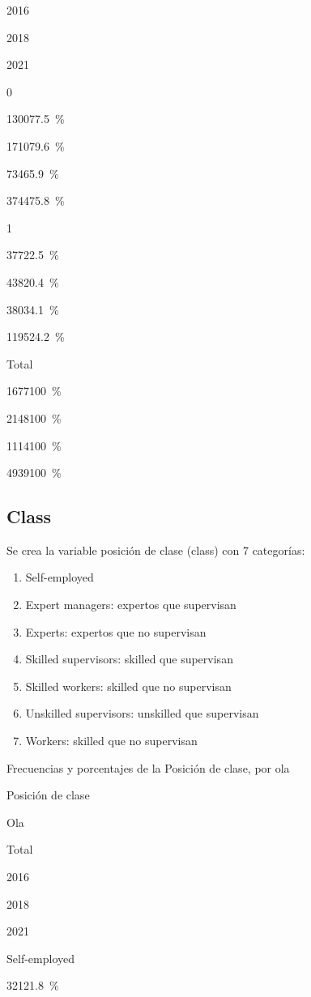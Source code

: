 \documentclass[
  12pt,
]{book}
\providecommand{\tightlist}{%
  \setlength{\itemsep}{0pt}\setlength{\parskip}{0pt}}
\begin{document}
2016

2018

2021

0

{1300}{77.5~\%}

{1710}{79.6~\%}

{734}{65.9~\%}

{3744}{75.8~\%}

1

{377}{22.5~\%}

{438}{20.4~\%}

{380}{34.1~\%}

{1195}{24.2~\%}

Total

{1677}{100~\%}

{2148}{100~\%}

{1114}{100~\%}

{4939}{100~\%}

\hypertarget{class}{%
\subsection{Class}\label{class}}

Se crea la variable posición de clase (class) con 7 categorías:

\begin{enumerate}
\def\labelenumi{\arabic{enumi}.}
\tightlist
\item
  Self-employed
\item
  Expert managers: expertos que supervisan
\item
  Experts: expertos que no supervisan
\item
  Skilled supervisors: skilled que supervisan
\item
  Skilled workers: skilled que no supervisan
\item
  Unskilled supervisors: unskilled que supervisan
\item
  Workers: skilled que no supervisan
\end{enumerate}

Frecuencias y porcentajes de la Posición de clase, por ola

Posición de clase

Ola

Total

2016

2018

2021

Self-employed

{321}{21.8~\%}
\end{document}
